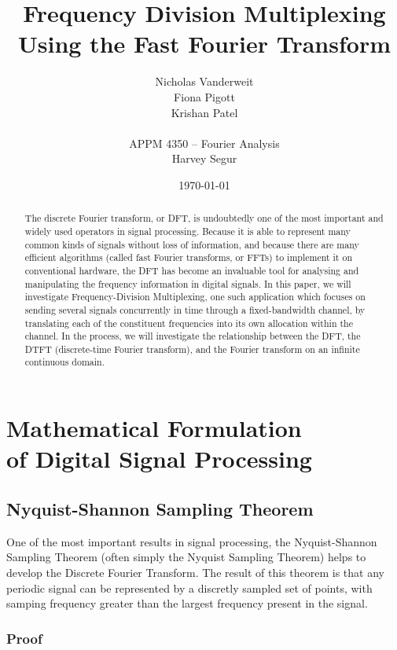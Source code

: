 \documentclass[12pt]{article}
\title{Frequency Division Multiplexing \\Using the Fast Fourier Transform }
\author{Nicholas Vanderweit \\Fiona Pigott \\Krishan Patel \\ \\APPM 4350 --
        Fourier Analysis \\Harvey Segur}
\date{\today}
\begin{document}
\maketitle


\begin{abstract}

The discrete Fourier transform, or DFT, is undoubtedly one of the most
important and widely used operators in signal processing. Because it is
able to represent many common kinds of signals without loss of information, and
because there are many efficient algorithms (called fast Fourier transforms, or
FFTs) to implement it on conventional hardware, the DFT has become an
invaluable tool for analysing and manipulating the frequency information in
digital signals. In this paper, we will investigate Frequency-Division
Multiplexing, one such application which focuses on sending several signals
concurrently in time through a fixed-bandwidth channel, by translating each of
the constituent frequencies into its own allocation within the channel. In the
process, we will investigate the relationship between the DFT, the DTFT
(discrete-time Fourier transform), and the Fourier transform on an infinite
continuous domain.


\end{abstract}

\clearpage

\section{Mathematical Formulation \\of Digital Signal Processing}

\subsection{Nyquist-Shannon Sampling Theorem}

One of the most important results in signal processing, the Nyquist-Shannon
Sampling Theorem (often simply the Nyquist Sampling Theorem) helps to develop
the Discrete Fourier Transform. The result of this theorem is that any periodic
signal can be represented by a discretly sampled set of points, with samping 
frequency greater than the largest frequency present in the signal. 

\subsubsection{Proof}
\end{document}
